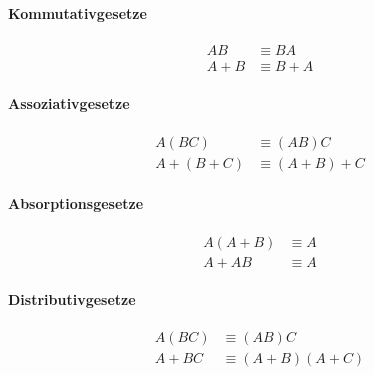 \documentclass[../main.tex]{subfiles}
\begin{document}
        \paragraph{Kommutativgesetze}
            \begin{subequations}
                \begin{align}
                    AB &\equiv BA\\
                    A + B &\equiv B + A
                \end{align}
            \end{subequations}
        
        \paragraph{Assoziativgesetze}
            \begin{subequations}
                \begin{align}
                    A (BC) &\equiv (AB) C\\
                    A + (B + C) &\equiv (A + B) + C
                \end{align}
            \end{subequations}
        
        \paragraph{Absorptionsgesetze}
            \begin{subequations}
                \begin{align}
                    A (A + B) &\equiv A\\
                    A + AB &\equiv A
                \end{align}
            \end{subequations}
        
        \paragraph{Distributivgesetze}
            \begin{subequations}
                \begin{align}
                    A (BC) &\equiv (AB) C\\
                    A + BC &\equiv (A + B)(A + C)
                \end{align}
            \end{subequations}
        
\end{document}

